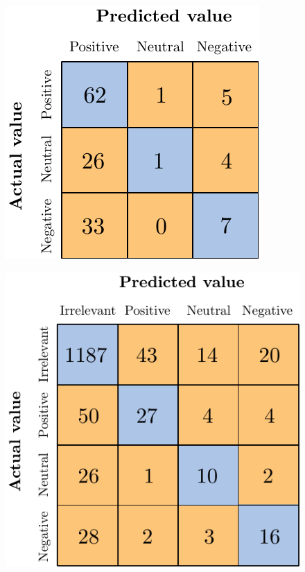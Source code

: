 \begin{figure}[H]
	\centering
	\includegraphics[scale=1]{figures/conf_matrices/ita_exteriors/ita_snt_exteriors_bpef_afs.pdf}
	\label{fig:ita_snt_exteriors_bpef_afs}
\end{figure}


\begin{figure}[H]
	\centering
	\includegraphics[scale=1]{figures/conf_matrices/ita_exteriors/ita_cascade_exteriors_bpef_tst.pdf}
	\label{fig:ita_cascade_exteriors_bpef_tst}
\end{figure}


